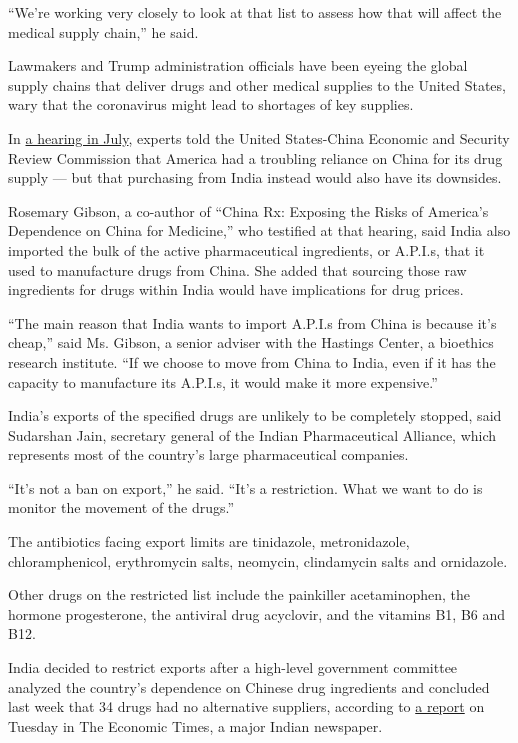 ``We're working very closely to look at that list to assess how that
will affect the medical supply chain,'' he said.

Lawmakers and Trump administration officials have been eyeing the global
supply chains that deliver drugs and other medical supplies to the
United States, wary that the coronavirus might lead to shortages of key
supplies.

In
\href{https://www.uscc.gov/hearings/exploring-growing-us-reliance-chinas-biotech-and-pharmaceutical-products}{a
hearing in July}, experts told the United States-China Economic and
Security Review Commission that America had a troubling reliance on
China for its drug supply --- but that purchasing from India instead
would also have its downsides.

Rosemary Gibson, a co-author of ``China Rx: Exposing the Risks of
America's Dependence on China for Medicine,'' who testified at that
hearing, said India also imported the bulk of the active pharmaceutical
ingredients, or A.P.I.s, that it used to manufacture drugs from China.
She added that sourcing those raw ingredients for drugs within India
would have implications for drug prices.

``The main reason that India wants to import A.P.I.s from China is
because it's cheap,'' said Ms. Gibson, a senior adviser with the
Hastings Center, a bioethics research institute. ``If we choose to move
from China to India, even if it has the capacity to manufacture its
A.P.I.s, it would make it more expensive.''

India's exports of the specified drugs are unlikely to be completely
stopped, said Sudarshan Jain, secretary general of the Indian
Pharmaceutical Alliance, which represents most of the country's large
pharmaceutical companies.

``It's not a ban on export,'' he said. ``It's a restriction. What we
want to do is monitor the movement of the drugs.''

The antibiotics facing export limits are tinidazole, metronidazole,
chloramphenicol, erythromycin salts, neomycin, clindamycin salts and
ornidazole.

Other drugs on the restricted list include the painkiller acetaminophen,
the hormone progesterone, the antiviral drug acyclovir, and the vitamins
B1, B6 and B12.

India decided to restrict exports after a high-level government
committee analyzed the country's dependence on Chinese drug ingredients
and concluded last week that 34 drugs had no alternative suppliers,
according to
\href{https://economictimes.indiatimes.com/industry/healthcare/biotech/pharmaceuticals/covid-19-impact-government-panel-lists-essential-drugs-that-can-run-out/articleshow/74449944.cms?from=mdr}{a
report} on Tuesday in The Economic Times, a major Indian newspaper.

